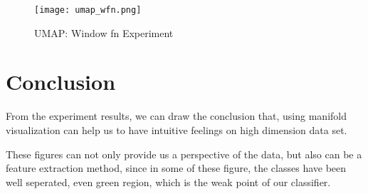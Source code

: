 \documentclass[conference]{IEEEtran}
\begin{document}
\begin{figure}[htbp]
    \centerline{\texttt{[image: umap\_wfn.png]}}
    \caption[This is the caption; This is the second line]
        {UMAP: Window fn Experiment \endtabular}
    \label{fig:umap_wfn}
\end{figure}
\section{Conclusion}
From the experiment results, we can draw the conclusion that, 
using manifold visualization can help us to have intuitive feelings
on high dimension data set.

These figures can not only provide us a perspective of the data, 
but also can be a feature extraction method, since in some of these figure,
the classes have been well seperated, even green region, which is the weak
point of our classifier.
\vspace{12pt}
\end{document}
